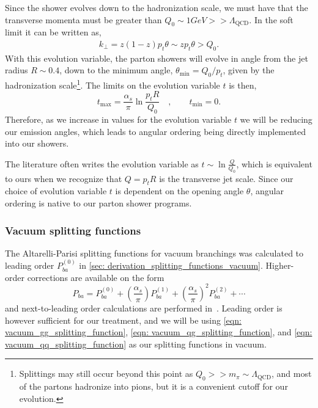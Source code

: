 \documentclass[main.tex]{subfiles}
\begin{document}
Since the shower evolves down to the hadronization scale, we must have that the transverse momenta must be greater than \(Q_0 \sim 1 GeV >>\Lambda_{\text{QCD}}\). In the soft limit it can be written as,  
\begin{align}
    k_\perp = z(1-z)p_t \theta \sim z p_t \theta > Q_0.
\end{align}
With this evolution variable, the parton showers will evolve in angle from the jet radius \(R \sim 0.4\), down to the minimum angle, \(\theta_{\text{min}} = Q_0/p_t\), given by the hadronization scale\footnote{Splittings may still occur beyond this point as \(Q_0>>m_\pi\sim \Lambda_{\text{QCD}}\), and most of the partons hadronize into pions, but it is a convenient cutoff for our evolution.}. The limits on the evolution variable \(t\) is then,
\begin{equation}\label{eqn: evolution_variable__limits_vacuum}
    t_{\text{max}} = \frac{\alpha_s}{\pi} \ln \frac{p_tR}{Q_0} \quad, \qquad t_{\text{min}} = 0.
\end{equation}
Therefore, as we increase in values for the evolution variable \(t\) we will be reducing our emission angles, which leads to angular ordering being directly implemented into our showers.

The literature often writes the evolution variable as \(t \sim \ln \frac{Q}{Q_0}\), which is equivalent to ours when we recognize that \(Q=p_tR\) is the transverse jet scale. Since our choice of evolution variable \(t\) is dependent on the opening angle \(\theta\), angular ordering is native to our parton shower programs.

\subsubsection*{Vacuum splitting functions}
The Altarelli-Parisi splitting functions for vacuum branchings was calculated to leading order \(P_{ba}^{(0)}\) in \autoref{sec: derivation_splitting_functions_vacuum}. Higher-order corrections are available on the form 
\begin{equation}
    P_{ba} = P_{ba}^{(0)}+ \left(\frac{\alpha_s}{\pi}\right) P_{ba}^{(1)} + \left(\frac{\alpha_s}{\pi}\right)^2 P_{ba}^{(2)} + \cdots
\end{equation}
and next-to-leading order calculations are performed in~\cite{Gehrmann_2014}. Leading order is however sufficient for our treatment, and we will be using \autoref{eqn: vacuum_gg_splitting_function}, \autoref{eqn: vacuum_qg_splitting_function}, and \autoref{eqn: vacuum_qq_splitting_function} as our splitting functions in vacuum.
\end{document}
